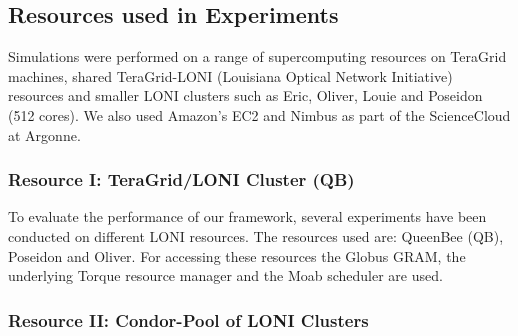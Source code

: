\documentclass[conference,final]{IEEEtran}
\newcommand{\up}{\vspace*{-1em}}
\newcommand{\jhanote}[1]{ {\textcolor{red} { ***SJ: #1 }}}
\newcommand{\jhanote}[1]{}
\begin{document}
\subsection{Resources used in Experiments}
\up 

Simulations were performed on a range of supercomputing resources on
TeraGrid machines, shared TeraGrid-LONI (Louisiana Optical Network
Initiative)~\cite{LONI_web} resources and smaller LONI clusters such
as Eric, Oliver, Louie and Poseidon (512 cores).  We also used
Amazon's EC2 and Nimbus as part of the ScienceCloud at Argonne.

\subsubsection*{Resource I: TeraGrid/LONI Cluster (QB)}

To evaluate the performance of our framework, several experiments 
have been conducted on different LONI resources. The resources used are: 
QueenBee (QB), Poseidon and Oliver. For accessing these resources
the Globus GRAM, the underlying Torque resource manager and the Moab scheduler are used.

\subsubsection*{Resource II: Condor-Pool of LONI Clusters}

\end{document}

